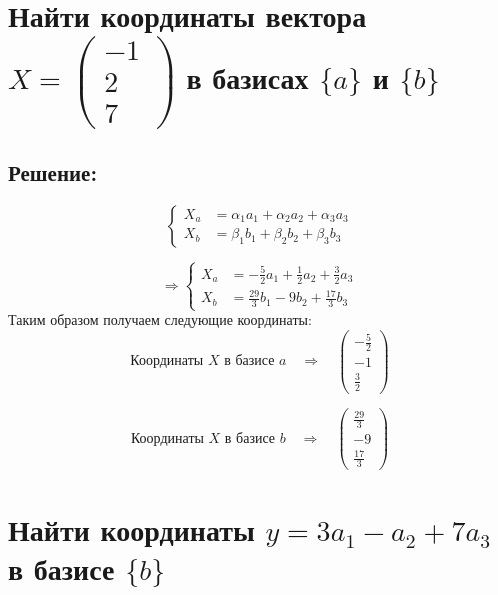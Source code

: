 \documentclass{article}
\begin{document}
        \section{Найти координаты вектора $X = \begin{pmatrix} -1 \\ 2 \\ 7 \end{pmatrix}$ в базисах $\{a\}$ и $\{b\}$} 
        
        \subsection{Решение:}
        
        
        \[
        \left\{
        \begin{aligned}
        X_a &= \alpha_1 a_1 + \alpha_2 a_2 + \alpha_3 a_3 \\
        X_b &= \beta_1 b_1 + \beta_2 b_2 + \beta_3 b_3
        \end{aligned}
        \right.
        \]

        \[
        \Longrightarrow
        \left\{
        \begin{aligned}
        X_a &= -\frac{5}{2} a_1 + \frac{1}{2} a_2 + \frac{3}{2} a_3 \\
        X_b &= \frac{29}{3} b_1 - 9 b_2 + \frac{17}{3} b_3
        \end{aligned}
        \right.
        \]
        Таким образом получаем следующие координаты:
        \[
        \textbf{Координаты $X$ в базисе $a$} \quad \Longrightarrow \quad
        \left(
        \begin{array}{c}
        -\frac{5}{2} \\
        -1 \\
        \frac{3}{2}
        \end{array}
        \right)
        \]

        \[
        \textbf{Координаты $X$ в базисе $b$} \quad\Longrightarrow \quad
        \left(
        \begin{array}{c}
        \frac{29}{3} \\
        -9 \\
        \frac{17}{3}
        \end{array}
        \right)
        \]

        \section{Найти координаты $y = 3a_1 - a_2 + 7a_3$ в базисе $\{b\}$} 
        
\end{document}
